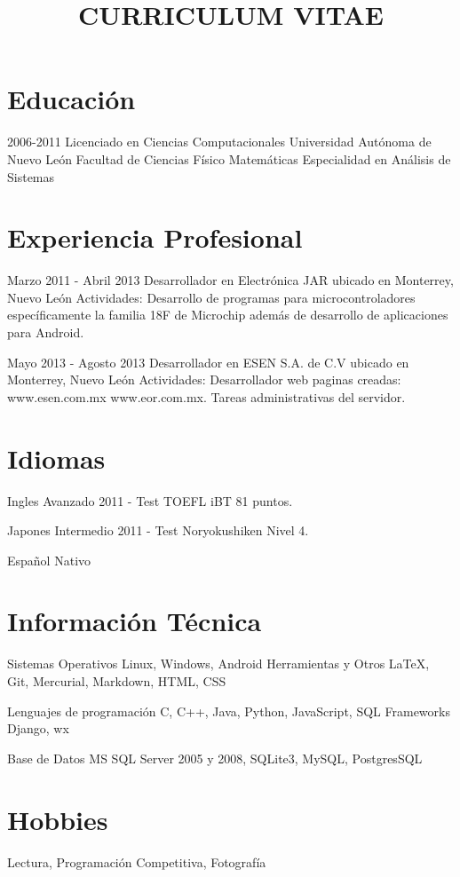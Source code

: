 \documentclass[11pt,a4paper]{moderncv}
\title{CURRICULUM VITAE{}}
\begin{document}
\maketitle

\section{Educación}
  \cventry
    {2006-2011}
    {Licenciado en Ciencias Computacionales}
    {Universidad Autónoma de Nuevo León}
    {Facultad de Ciencias Físico Matemáticas}
    {Especialidad en Análisis de Sistemas}
    {}

\section{Experiencia Profesional}
  \cventry
  {Marzo 2011 - Abril 2013}
  {Desarrollador}
  {en Electrónica JAR}
  {ubicado en Monterrey, Nuevo León}
  {}
  {Actividades: Desarrollo de programas para microcontroladores específicamente la familia 18F de Microchip además de desarrollo de aplicaciones para Android.}

  \cventry
    {Mayo 2013 - Agosto 2013}
    {Desarrollador}
    {en ESEN S.A. de C.V}
    {ubicado en Monterrey, Nuevo León}
    {}
    {Actividades: Desarrollador web paginas creadas: www.esen.com.mx www.eor.com.mx. Tareas administrativas del servidor.}

\section{Idiomas}
  \cvlanguage
    {Ingles}
    {Avanzado}
    {2011 - Test TOEFL iBT 81 puntos.}

  \cvlanguage
    {Japones}
    {Intermedio}
    {2011 - Test Noryokushiken Nivel 4.}

  \cvlanguage
    {Español}
    {Nativo}
    {}

\section{Información Técnica}
  \cvcomputer
    {Sistemas Operativos}
      {Linux, Windows, Android}
    {Herramientas y Otros}
      {\LaTeX, Git, Mercurial, Markdown, HTML, CSS}

  \cvcomputer
    {Lenguajes de programación}
      {C, C++, Java, Python, JavaScript, SQL}
    {Frameworks}
      {Django, wx}

  \cvcomputer
    {Base de Datos}
      {MS SQL Server 2005 y 2008, SQLite3, MySQL, PostgresSQL}
    {}
      {}

\section{Hobbies}
  \cvline
  {}
  {Lectura, Programación Competitiva, Fotografía}
\end{document}
